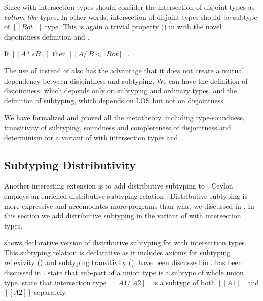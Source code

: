 \noindent Since \cal with intersection types should consider the intersection of disjoint types 
as \emph{bottom-like} types. In other words, intersection of disjoint types
should be subtype of $[[Bot]]$ type.
This is again a trivial property () in \cal 
with the novel disjointness definition and .

\begin{lemma}
  If $[[A *s B]]$ then $[[A /\ B <: Bot]]$.
\label{lemma:discussion:disjoint-types}
\end{lemma}

\noindent The use of  instead of  also has the advantage that it does not
create a mutual dependency between disjointness and subtyping. We can have the definition
of disjointness, which depends only on subtyping and ordinary types, and the definition
of subtyping, which depends on LOS but not on disjointness.

We have formalized and proved all the metatheory, including type-soundness, transitivity of subtyping,
soundness and completeness of disjointness and determinism for a variant of \name with intersection types
and .

\subsection{Subtyping Distributivity}
\label{sec:inter:dist}

 

Another interesting extension is to add distributive subtyping to \cal.
Ceylon~\cite{muehlboeck2018empowering} employs an enriched 
distributive subtyping relation \cite{barendregt1983filter,barbanera1995intersection}.
Distributive subtyping is more expressive and accomodates more programs than what we discussed in
. In this section we add distributive subtyping in the variant of \cal with
intersection types. 

 shows declarative version of distributive subtyping for \cal with intersection types.
This subtyping relation is declarative as it includes axioms for subtyping reflexivity () and
subtyping transitivity ().  have been
discussed in .  has been discussed in .
 state that sub-part of a union type is a subtype of whole union type.
 state that intersection type $[[A1 /\ A2]]$ is a subtype of both $[[A1]]$
and $[[A2]]$ separately.

